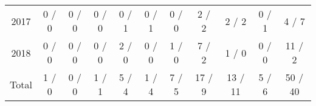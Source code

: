 \documentclass[a4paper]{article}
\begin{document}
\begin{table}
{\begin{tabular}[t]{ccccccccccc}
\hspace{1em}2017 & 0 / 0 & 0 / 0 & 0 / 0 & 0 / 1 & 0 / 1 & 0 / 0 & 2 / 2 & 2 / 2 & 0 / 1 & 4 / 7\\
\hspace{1em}2018 & 0 / 0 & 0 / 0 & 0 / 0 & 2 / 0 & 0 / 0 & 1 / 0 & 7 / 2 & 1 / 0 & 0 / 0 & 11 / 2\\
\hspace{1em}Total & 1 / 0 & 0 / 0 & 1 / 1 & 5 / 4 & 1 / 4 & 7 / 5 & 17 / 9 & 13 / 11 & 5 / 6 & 50 / 40\\
\bottomrule
\end{tabular}}
\end{table}
\end{document}
